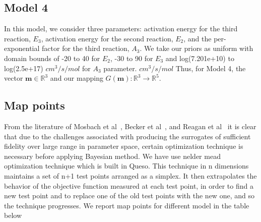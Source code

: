 \subsection{Model 4}


 In this model, we consider three parameters: activation energy for
 the third reaction, $E_3$,
 activation energy for the second reaction, $E_2$, and the per-exponential
 factor for the third reaction, $A_3$. We take our priors as uniform
 with domain bounds of -20 to 40 for $E_2$, -30 to 90 for $E_3$ and
 log(7.201e+10) to log(2.5e+17) $cm^3/s/mol$ for $A_3$ parameter. $cm^3/s/mol$
Thus, for Model 4, the vector
 $\mathbf{m} \in \mathbb{R}^3$ and our mapping $G(\mathbf{m}):
\mathbb{R}^3 \rightarrow \mathbb{R}^5$.


\subsection{Map points}

From the literature of Mosbach et al~\cite{mosbac}, Becker et al~\cite{Braack}, and Reagan et al~\cite{Reagan} it is clear that  due to the challenges associated with producing the surrogates of sufficient fidelity over large range in parameter space, certain optimization technique is necessary before applying Bayesian method. We have use nelder mead optimization technique  which is built in Queso. This technique in n dimensions maintains a set of n+1 test points arranged as a simplex. It then extrapolates the behavior of the objective function measured at each test point, in order to find a new test point and to replace one of the old test points with the new one, and so the technique progresses. We report map points for different model in the table below

